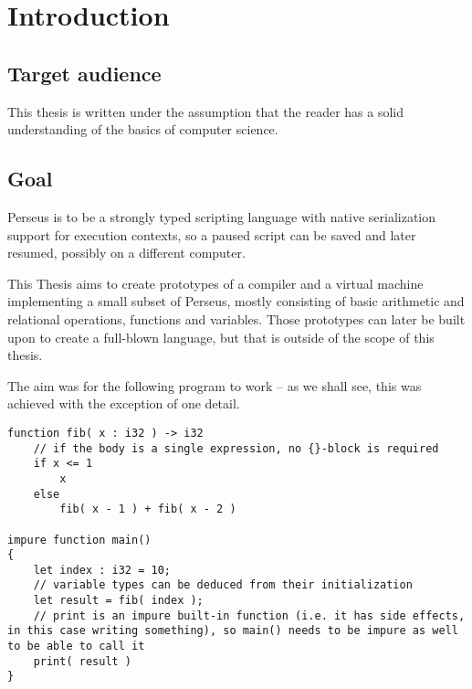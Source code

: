 
\chapter{Introduction} %

    
    \section{Target audience}
    This thesis is written under the assumption that the reader has a solid understanding of the basics of computer science.

	\section{Goal} %
	
	Perseus is to be a strongly typed scripting language with native serialization support for execution contexts, so a paused script can be saved and later resumed, possibly on a different computer.
	
	This Thesis aims to create prototypes of a compiler and a virtual machine implementing a small subset of Perseus, mostly consisting of basic arithmetic and relational operations, functions and variables. Those prototypes can later be built upon to create a full-blown language, but that is outside of the scope of this thesis.
	
	The aim was for the following program to work -- as we shall see, this was achieved with the exception of one detail.
	
	\lstperseus
	\begin{lstlisting}[caption={Desired target language example},label={lst:target_language}]
function fib( x : i32 ) -> i32
    // if the body is a single expression, no {}-block is required
    if x <= 1
        x
    else
        fib( x - 1 ) + fib( x - 2 )

impure function main()
{
	let index : i32 = 10;
	// variable types can be deduced from their initialization
	let result = fib( index );
	// print is an impure built-in function (i.e. it has side effects, in this case writing something), so main() needs to be impure as well to be able to call it
	print( result )
}
	\end{lstlisting}
	
